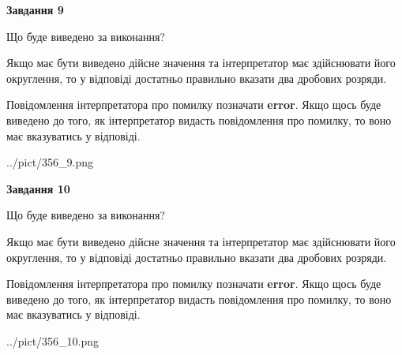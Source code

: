 \documentclass[12pt, ukrainian]{article}
\begin{document}
{\begin {Large}
{\begin {center}\textbf{Завдання 9}\end {center}}\par
Що буде виведено за виконання? \par

Якщо має бути виведено дійсне значення та інтерпретатор має здійснювати його округлення, 
то у відповіді достатньо правильно вказати два дробових розряди.

Повідомлення інтерпретатора про помилку позначати \textbf{error}.
Якщо щось буде виведено до того, як інтерпретатор видасть повідомлення про помилку, 
то воно має вказуватись у відповіді. \par

\begin{center}
	{../pict/356_9.png}
\end{center}
\newpage

{\begin {center}\textbf{Завдання 10}\end {center}}\par
Що буде виведено за виконання? \par

Якщо має бути виведено дійсне значення та інтерпретатор має здійснювати його округлення, 
то у відповіді достатньо правильно вказати два дробових розряди.

Повідомлення інтерпретатора про помилку позначати \textbf{error}.
Якщо щось буде виведено до того, як інтерпретатор видасть повідомлення про помилку, 
то воно має вказуватись у відповіді. \par

\begin{center}
	{../pict/356_10.png}
\end{center}
\newpage

\end {Large}}
\end{document}
